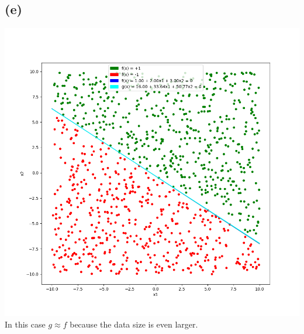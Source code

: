 \documentclass{article}
\begin{document}
	\subsection*{(e)}
		\includegraphics[scale=0.7]{p1.4e.png}\\
		In this case $g \approx f$ because the data size is even larger.
\end{document}
